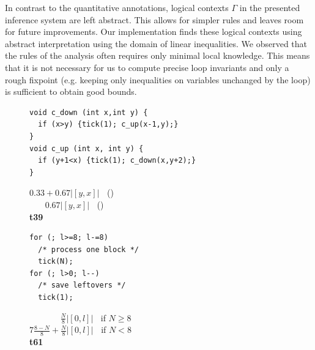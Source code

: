 \documentclass[nocopyrightspace,preprint,pldi]{sigplanconf-pldi15}
\newcommand{\ifshort}[2]{\ifx\fullversion\undefined{#1}\else{#2}\fi}
\begin{document}
In contrast to the quantitative annotations, logical contexts $\Gamma$
in the presented inference system are left abstract.  This allows for
simpler rules and leaves room for future improvements.
Our implementation finds these logical contexts using abstract
interpretation using the domain of linear inequalities.  We observed that
the rules of the analysis often requires only minimal local knowledge.
This means that it is not necessary for us to compute precise loop
invariants and only a rough fixpoint (e.g. keeping only inequalities on
variables unchanged by the loop) is sufficient to obtain good bounds.



\begin{figure}
  \centering
\ifshort{\vspace{-1.8cm}
\hspace{-0.4cm}}{}
  \begin{minipage}[b]{7cm}
    \begin{center}
   \begin{lstlisting}[]
void c_down (int x,int y) {
  if (x>y) {tick(1); c_up(x-1,y);}
}
void c_up (int x, int y) {
  if (y+1<x) {tick(1); c_down(x,y+2);}
}
   \end{lstlisting}
\vspace{-2.5ex}
$0.33 + 0.67 |[y,x]|\;\;$ ()\\
$\;\;\;\;\;\;\,0.67 |[y,x]|\;\;$ ()
\\[.4\baselineskip]
      {\bf t39}
    \end{center}
  \end{minipage}
%
\hfill
%
  \begin{minipage}[b]{5cm}
    \begin{center}
   \begin{lstlisting}
for (; l>=8; l-=8)
  /* process one block */
  tick(N);
for (; l>0; l--)
  /* save leftovers */
  tick(1);
   \end{lstlisting}
\vspace{-2.5ex}
$\;\;\;\;\;\;\;\;\;\;\;\;\;\frac{N}{8} |[0,l]|\;\;$ if $N \geq 8$\\
$7\frac{8-N}{8} + \frac{N}{8}|[0,l]|\;\;$ if $N < 8$
\\[.4\baselineskip]
      {\bf t61}
    \end{center}
  \end{minipage}
%
\hfill
%
  \begin{minipage}[b]{5.5cm}
    \begin{center}
   \begin{lstlisting}



\end{lstlisting}
\end{center}
\end{minipage}
\end{figure}
\end{document}

